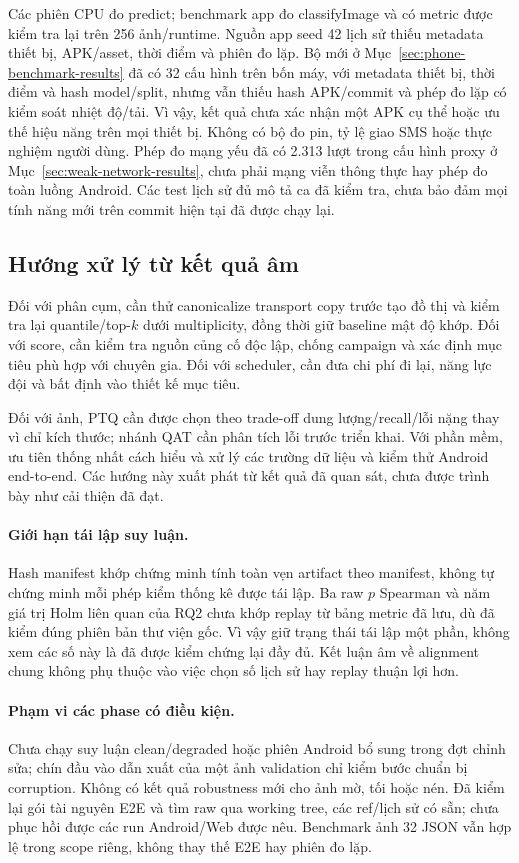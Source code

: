 Các phiên CPU đo predict; benchmark app đo classifyImage và có metric được kiểm tra lại trên 256 ảnh/runtime. Nguồn app seed 42 lịch sử thiếu metadata thiết bị, APK/asset, thời điểm và phiên đo lặp. Bộ mới ở Mục~\ref{sec:phone-benchmark-results} đã có 32 cấu hình trên bốn máy, với metadata thiết bị, thời điểm và hash model/split, nhưng vẫn thiếu hash APK/commit và phép đo lặp có kiểm soát nhiệt độ/tải. Vì vậy, kết quả chưa xác nhận một APK cụ thể hoặc ưu thế hiệu năng trên mọi thiết bị. Không có bộ đo pin, tỷ lệ giao SMS hoặc thực nghiệm người dùng. Phép đo mạng yếu đã có 2.313 lượt trong cấu hình proxy ở Mục~\ref{sec:weak-network-results}, chưa phải mạng viễn thông thực hay phép đo toàn luồng Android. Các test lịch sử đủ mô tả ca đã kiểm tra, chưa bảo đảm mọi tính năng mới trên commit hiện tại đã được chạy lại.

\subsection{Hướng xử lý từ kết quả âm}
Đối với phân cụm, cần thử canonicalize transport copy trước tạo đồ thị và kiểm tra lại quantile/top-$k$ dưới multiplicity, đồng thời giữ baseline mật độ khớp. Đối với score, cần kiểm tra nguồn củng cố độc lập, chống campaign và xác định mục tiêu phù hợp với chuyên gia. Đối với scheduler, cần đưa chi phí đi lại, năng lực đội và bất định vào thiết kế mục tiêu.

Đối với ảnh, PTQ cần được chọn theo trade-off dung lượng/recall/lỗi nặng thay vì chỉ kích thước; nhánh QAT cần phân tích lỗi trước triển khai. Với phần mềm, ưu tiên thống nhất cách hiểu và xử lý các trường dữ liệu và kiểm thử Android end-to-end. Các hướng này xuất phát từ kết quả đã quan sát, chưa được trình bày như cải thiện đã đạt.

\paragraph{Giới hạn tái lập suy luận.} Hash manifest khớp chứng minh tính toàn vẹn artifact theo manifest, không tự chứng minh mỗi phép kiểm thống kê được tái lập. Ba raw $p$ Spearman và năm giá trị Holm liên quan của RQ2 chưa khớp replay từ bảng metric đã lưu, dù đã kiểm đúng phiên bản thư viện gốc. Vì vậy giữ trạng thái tái lập một phần, không xem các số này là đã được kiểm chứng lại đầy đủ. Kết luận âm về alignment chung không phụ thuộc vào việc chọn số lịch sử hay replay thuận lợi hơn.


\paragraph{Phạm vi các phase có điều kiện.} Chưa chạy suy luận clean/degraded hoặc phiên Android bổ sung trong đợt chỉnh sửa; chín đầu vào dẫn xuất của một ảnh validation chỉ kiểm bước chuẩn bị corruption. Không có kết quả robustness mới cho ảnh mờ, tối hoặc nén. Đã kiểm lại gói tài nguyên E2E và tìm raw qua working tree, các ref/lịch sử có sẵn; chưa phục hồi được các run Android/Web được nêu. Benchmark ảnh 32 JSON vẫn hợp lệ trong scope riêng, không thay thế E2E hay phiên đo lặp.
